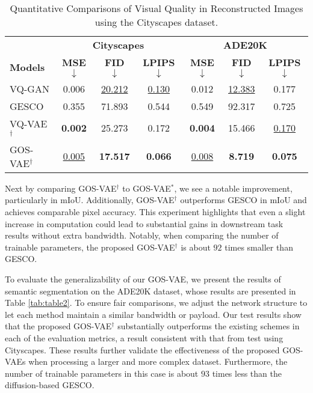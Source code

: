 \begin{table}[htb]
\centering
\vspace*{-3mm}
\caption{Quantitative Comparisons of Visual Quality in Reconstructed Images using the Cityscapes dataset.}
\small
\begin{tabular}{l@{\hskip 4pt}c@{\hskip 4pt}c@{\hskip 4pt}c@{\hskip 8pt}c@{\hskip 4pt}c@{\hskip 4pt}c}
\toprule
 & \multicolumn{3}{c}{\textbf{Cityscapes}} & \multicolumn{3}{c}{\textbf{ADE20K}} \\
\cmidrule(lr){2-4} \cmidrule(lr){5-7}
\textbf{Models} & \textbf{MSE $\downarrow$} & \textbf{FID $\downarrow$} & \textbf{LPIPS $\downarrow$} & \textbf{MSE $\downarrow$} & \textbf{FID $\downarrow$} & \textbf{LPIPS $\downarrow$} \\
\midrule
VQ-GAN & 0.006 & \underline{20.212} & \underline{0.130} & 0.012 & \underline{12.383} & 0.177 \\
GESCO & 0.355 & 71.893 & 0.544 & 0.549 & 92.317 & 0.725 \\
VQ-VAE$^\dagger$ & \textbf{0.002} & 25.273 & 0.172 & \textbf{0.004} & 15.466 & \underline{0.170} \\
GOS-VAE$^\dagger$ & \underline{0.005} & \textbf{17.517} & \textbf{0.066} & \underline{0.008} & \textbf{8.719} & \textbf{0.075} \\
\bottomrule
\end{tabular}
\vspace*{-1mm}
\label{tab:table3}
\end{table}






Next by comparing GOS-VAE$^{\dagger}$ to GOS-VAE$^{*}$, we see a notable improvement, particularly in mIoU. Additionally, GOS-VAE$^{\dagger}$ outperforms GESCO in mIoU and achieves comparable pixel accuracy. This experiment highlights that even a slight increase in computation could lead to substantial gains in downstream task results without extra bandwidth. Notably, when comparing the number of trainable parameters, the proposed GOS-VAE$^{\dagger}$ is about $92$ times smaller than GESCO.


To evaluate the generalizability of our GOS-VAE, we present the results of semantic segmentation on the ADE20K dataset, whose results are presented in Table \ref{tab:table2}. To ensure fair comparisons, we adjust the network structure to let each method maintain a similar bandwidth or payload. Our test results show that the proposed GOS-VAE$^{\dagger}$ substantially outperforms the existing schemes in 
each of the evaluation metrics, 
a result consistent with that from
test using Cityscapes.
These results further validate the effectiveness of the proposed GOS-VAEs when processing a larger and more complex dataset. Furthermore, the number of trainable parameters in this case is about $93$ times less than the diffusion-based GESCO.


